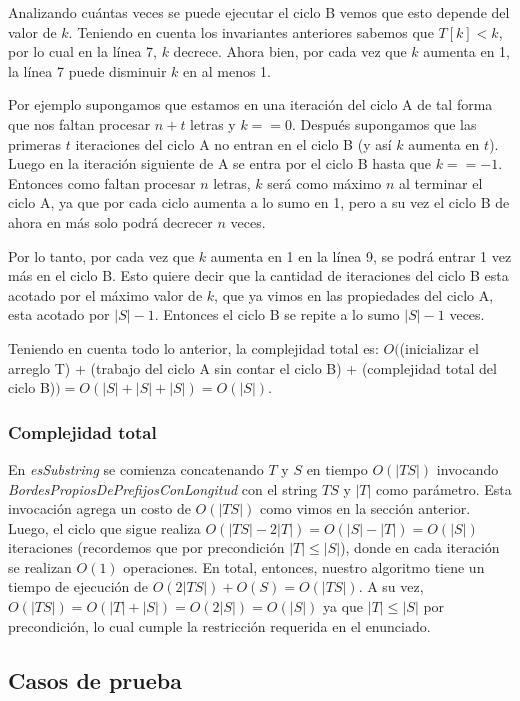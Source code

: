 Analizando cuántas veces se puede ejecutar el ciclo B vemos que esto depende del valor de $k$.
Teniendo en cuenta los invariantes anteriores sabemos que $T[k] < k$, por lo cual en la línea 7,
$k$ decrece. Ahora bien, por cada vez que $k$ aumenta en 1, la línea 7 puede disminuir $k$ en al menos 1.

Por ejemplo supongamos que estamos en una iteración del ciclo A de tal forma que nos faltan procesar $n+t$
letras y $k == 0$. Después supongamos que las primeras $t$ iteraciones del ciclo A no entran en el ciclo B
(y así $k$ aumenta en $t$). Luego en la iteración siguiente de A se entra por el ciclo B hasta que
$k == -1$. Entonces como faltan procesar $n$ letras, $k$ será como máximo $n$ al terminar el ciclo A, 
ya que por cada ciclo aumenta a lo sumo en 1, pero a su vez el ciclo B de ahora en más solo podrá
decrecer $n$ veces.

Por lo tanto, por cada vez que $k$ aumenta en 1 en la línea 9, se podrá entrar 1 vez más en el ciclo B. Esto
quiere decir que la cantidad de iteraciones del ciclo B esta acotado por el máximo valor de $k$, que ya
vimos en las propiedades del ciclo A, esta acotado por $|S|-1$. Entonces el ciclo B se repite a lo sumo $|S|-1$
veces.

Teniendo en cuenta todo lo anterior, la complejidad total es:
$O($(inicializar el arreglo T) + (trabajo del ciclo A sin contar el ciclo B) + (complejidad total del ciclo B)$)
= O(|S| + |S| + |S|) = O(|S|)$.

\subsubsection{Complejidad total}

En \textit{esSubstring} se comienza concatenando $T$ y $S$ en tiempo $O(|TS|)$ invocando \textit{BordesPropiosDePrefijosConLongitud} con el string $TS$ y $|T|$ como parámetro. Esta invocación agrega un costo de $O(|TS|)$ como vimos en la sección anterior. Luego, el ciclo que sigue realiza $O(|TS|-2|T|) = O(|S|-|T|) = O(|S|)$ iteraciones (recordemos que por precondición $|T| \leq |S|$), donde en cada iteración se realizan $O(1)$ operaciones. En total, entonces, nuestro algoritmo tiene un tiempo de ejecución de $O(2|TS|) + O(S) = O(|TS|)$. A su vez, $O(|TS|) = O(|T|+|S|) = O(2|S|) = O(|S|)$ ya que $|T| \leq |S|$ por precondición, lo cual cumple la restricción requerida en el enunciado.

\subsection{Casos de prueba}

